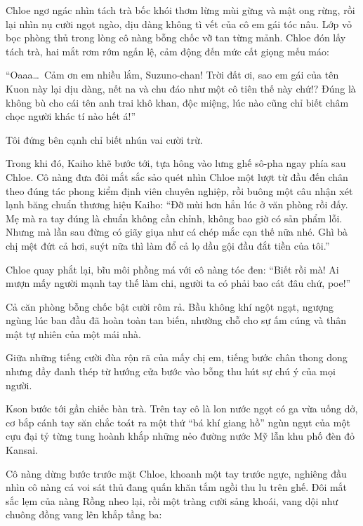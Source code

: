 \documentclass[../main.tex]{subfiles}
\begin{document}
Chloe ngơ ngác nhìn tách trà bốc khói thơm lừng mùi gừng và mật ong rừng, rồi lại nhìn nụ cười ngọt ngào, dịu dàng không tì vết của cô em gái tóc nâu. Lớp vỏ bọc phòng thủ trong lòng cô nàng bỗng chốc vỡ tan từng mảnh. Chloe đón lấy tách trà, hai mắt rơm rớm ngấn lệ, cảm động đến mức cất giọng mếu máo:

``Oaaa\dots\ Cảm ơn em nhiều lắm, Suzuno-chan! Trời đất ơi, sao em gái của tên Kuon này lại dịu dàng, nết na và chu đáo như một cô tiên thế này chứ!? Đúng là không bù cho cái tên anh trai khô khan, độc miệng, lúc nào cũng chỉ biết châm chọc người khác tí nào hết á!''

Tôi đứng bên cạnh chỉ biết nhún vai cười trừ.

Trong khi đó, Kaiho khẽ bước tới, tựa hông vào lưng ghế sô-pha ngay phía sau Chloe. Cô nàng đưa đôi mắt sắc sảo quét nhìn Chloe một lượt từ đầu đến chân theo đúng tác phong kiểm định viên chuyên nghiệp, rồi buông một câu nhận xét lạnh băng chuẩn thương hiệu Kaiho: ``Đỡ mùi hơn hẳn lúc ở văn phòng rồi đấy. Mẹ mà ra tay đúng là chuẩn không cần chỉnh, không bao giờ có sản phẩm lỗi. Nhưng mà lần sau đừng có giãy giụa như cá chép mắc cạn thế nữa nhé. Ghì bà chị mệt đứt cả hơi, suýt nữa thì làm đổ cả lọ dầu gội đầu đắt tiền của tôi.''

Chloe quay phắt lại, bĩu môi phồng má với cô nàng tóc đen: ``Biết rồi mà! Ai mượn mấy người mạnh tay thế làm chi, người ta có phải bao cát đâu chứ, poe!''

Cả căn phòng bỗng chốc bật cười rôm rả. Bầu không khí ngột ngạt, ngượng ngùng lúc ban đầu đã hoàn toàn tan biến, nhường chỗ cho sự ấm cúng và thân mật tự nhiên của một mái nhà.

\ct


Giữa những tiếng cười đùa rộn rã của mấy chị em, tiếng bước chân thong dong nhưng đầy đanh thép từ hướng cửa bước vào bỗng thu hút sự chú ý của mọi người.

Kson bước tới gần chiếc bàn trà. Trên tay cô là lon nước ngọt có ga vừa uống dở, cơ bắp cánh tay săn chắc toát ra một thứ ``bá khí giang hồ'' ngùn ngụt của một cựu đại tỷ từng tung hoành khắp những nẻo đường nước Mỹ lẫn khu phố đèn đỏ Kansai.

Cô nàng dừng bước trước mặt Chloe, khoanh một tay trước ngực, nghiêng đầu nhìn cô nàng cá voi sát thủ đang quấn khăn tắm ngồi thu lu trên ghế. Đôi mắt sắc lẹm của nàng Rồng nheo lại, rồi một tràng cười sảng khoái, vang dội như chuông đồng vang lên khắp tầng ba:
\end{document}
